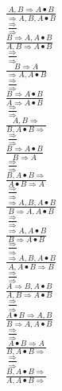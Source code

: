 \documentclass[11pt]{article}
\begin{document}
\begin{center}
\bigskip
\\$\frac{A, B\Rightarrow A\bullet B}{\Rightarrow A, B, A\bullet B}$
\bigskip
\\$\frac{\Rightarrow }{\Rightarrow }$
\bigskip
\\$\frac{B\Rightarrow A, A\bullet B}{A, B\Rightarrow A\bullet B}$
\bigskip
\\$\frac{\Rightarrow }{\Rightarrow }$
\bigskip
\\$\frac{B\Rightarrow A}{\Rightarrow A, A\bullet B}$
\bigskip
\\$\frac{\Rightarrow }{\Rightarrow }$
\bigskip
\\$\frac{B\Rightarrow A\bullet B}{A\Rightarrow A\bullet B}$
\bigskip
\\$\frac{\Rightarrow }{\Rightarrow }$
\bigskip
\\$\frac{A, B\Rightarrow }{B, A\bullet B\Rightarrow }$
\bigskip
\\$\frac{\Rightarrow }{\Rightarrow }$
\bigskip
\\$\frac{B\Rightarrow A\bullet B}{B\Rightarrow A}$
\bigskip
\\$\frac{\Rightarrow }{\Rightarrow }$
\bigskip
\\$\frac{B, A\bullet B\Rightarrow }{A\bullet B\Rightarrow A}$
\bigskip
\\$\frac{\Rightarrow }{\Rightarrow }$
\bigskip
\\$\frac{\Rightarrow A, B, A\bullet B}{B\Rightarrow A, A\bullet B}$
\bigskip
\\$\frac{\Rightarrow }{\Rightarrow }$
\bigskip
\\$\frac{\Rightarrow A, A\bullet B}{B\Rightarrow A\bullet B}$
\bigskip
\\$\frac{\Rightarrow }{\Rightarrow }$
\bigskip
\\$\frac{\Rightarrow A, B, A\bullet B}{A, A\bullet B\Rightarrow B}$
\bigskip
\\$\frac{\Rightarrow }{\Rightarrow }$
\bigskip
\\$\frac{A\Rightarrow B, A\bullet B}{A, B\Rightarrow A\bullet B}$
\bigskip
\\$\frac{\Rightarrow }{\Rightarrow }$
\bigskip
\\$\frac{A\bullet B\Rightarrow A, B}{B\Rightarrow A, A\bullet B}$
\bigskip
\\$\frac{\Rightarrow }{\Rightarrow }$
\bigskip
\\$\frac{A\bullet B\Rightarrow A}{B, A\bullet B\Rightarrow }$
\bigskip
\\$\frac{\Rightarrow }{\Rightarrow }$
\bigskip
\\$\frac{B, A\bullet B\Rightarrow }{A, A\bullet B\Rightarrow }$

\end{center}
\end{document}
